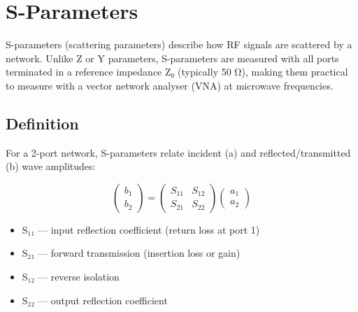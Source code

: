 \section{S-Parameters}\label{sec:wiki_sparam}



S-parameters (scattering parameters) describe how RF signals are scattered by a network. Unlike Z or Y parameters, S-parameters are measured with all ports terminated in a reference impedance Z₀ (typically 50 Ω), making them practical to measure with a vector network analyser (VNA) at microwave frequencies.

				

\subsection{Definition}

				


				

For a 2-port network, S-parameters relate incident (a) and reflected/transmitted (b) wave amplitudes:

				
\[\begin{pmatrix}b_1\\b_2\end{pmatrix} = \begin{pmatrix}S_{11}&S_{12}\\S_{21}&S_{22}\end{pmatrix}\begin{pmatrix}a_1\\a_2\end{pmatrix}\]

				
\begin{itemize}

					\item S₁₁ — input reflection coefficient (return loss at port 1)

					\item S₂₁ — forward transmission (insertion loss or gain)

					\item S₁₂ — reverse isolation

					\item S₂₂ — output reflection coefficient

				
\end{itemize}

